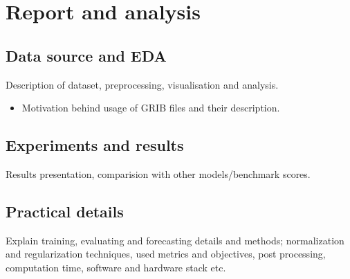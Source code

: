 \chapter{Report and analysis}

\section{Data source and EDA}
Description of dataset, preprocessing, visualisation and analysis.
\begin{itemize}
    \item Motivation behind usage of GRIB files and their description.
\end{itemize}

\section{Experiments and results}
Results presentation, comparision with other models/benchmark scores. 

\section{Practical details}
Explain training, evaluating and forecasting details and methods;
normalization and regularization techniques, used metrics and objectives, post processing, computation time, software and hardware stack etc.

